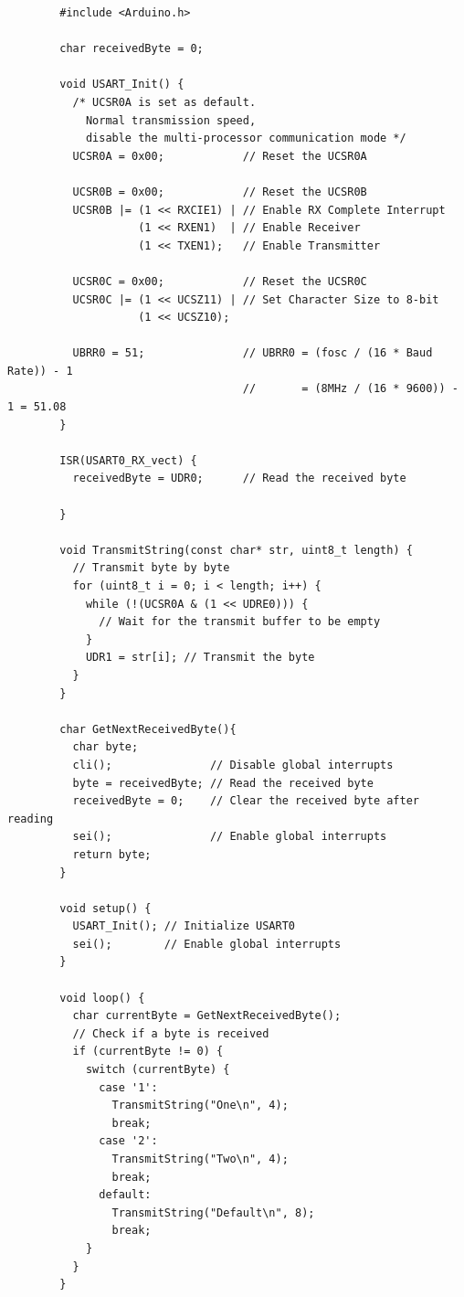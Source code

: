 \documentclass{article}
\begin{document}
\begin{verbatim}
        #include <Arduino.h>

        char receivedByte = 0;
        
        void USART_Init() {
          /* UCSR0A is set as default. 
            Normal transmission speed, 
            disable the multi-processor communication mode */
          UCSR0A = 0x00;            // Reset the UCSR0A
        
          UCSR0B = 0x00;            // Reset the UCSR0B
          UCSR0B |= (1 << RXCIE1) | // Enable RX Complete Interrupt
                    (1 << RXEN1)  | // Enable Receiver
                    (1 << TXEN1);   // Enable Transmitter
        
          UCSR0C = 0x00;            // Reset the UCSR0C
          UCSR0C |= (1 << UCSZ11) | // Set Character Size to 8-bit
                    (1 << UCSZ10);
                    
          UBRR0 = 51;               // UBRR0 = (fosc / (16 * Baud Rate)) - 1
                                    //       = (8MHz / (16 * 9600)) - 1 = 51.08
        }
        
        ISR(USART0_RX_vect) {
          receivedByte = UDR0;      // Read the received byte
          
        }
        
        void TransmitString(const char* str, uint8_t length) {
          // Transmit byte by byte
          for (uint8_t i = 0; i < length; i++) {
            while (!(UCSR0A & (1 << UDRE0))) {
              // Wait for the transmit buffer to be empty
            }
            UDR1 = str[i]; // Transmit the byte
          }
        }
        
        char GetNextReceivedByte(){
          char byte;
          cli();               // Disable global interrupts
          byte = receivedByte; // Read the received byte
          receivedByte = 0;    // Clear the received byte after reading
          sei();               // Enable global interrupts
          return byte;
        }
        
        void setup() {
          USART_Init(); // Initialize USART0
          sei();        // Enable global interrupts
        }
        
        void loop() {
          char currentByte = GetNextReceivedByte();
          // Check if a byte is received
          if (currentByte != 0) {
            switch (currentByte) {
              case '1':
                TransmitString("One\n", 4);
                break;
              case '2':
                TransmitString("Two\n", 4);
                break;
              default:
                TransmitString("Default\n", 8);
                break;
            }
          }
        }  
\end{verbatim}
\end{document}
